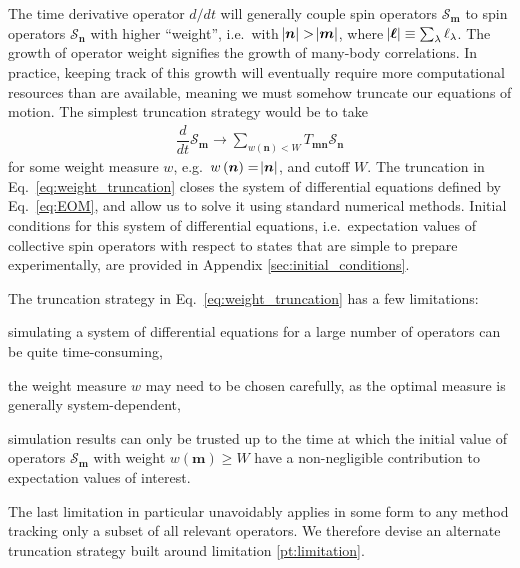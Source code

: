 \documentclass[aps,11pt,notitlepage,nofootinbib,longbibliography]{revtex4-1}
\newcommand{\f}[2]{\dfrac{#1}{#2}} %
\newcommand{\p}[1]{\left(#1\right)} %
\renewcommand{\v}{\bm} %
\renewcommand{\S}{\mathcal{S}}
\newcommand{\1}{\mathds{1}}
\begin{document}
The time derivative operator $d/dt$ will generally couple spin
operators $\S_{\v m}$ to spin operators $\S_{\v n}$ with higher
``weight'', i.e.~with $\abs{\v n}>\abs{\v m}$, where
$\abs{\v\ell}\equiv\sum_\lambda\ell_\lambda$.  The growth of operator
weight signifies the growth of many-body correlations.  In practice,
keeping track of this growth will eventually require more
computational resources than are available, meaning we must somehow
truncate our equations of motion.  The simplest truncation strategy
would be to take
\begin{align}
  \f{d}{dt} \S_{\v m}
  \to \sum_{w\p{\v n}<W} T_{\v m\v n} \S_{\v n}
  \label{eq:weight_truncation}
\end{align}
for some weight measure $w$, e.g.~$w\p{\v n}=\abs{\v n}$, and cutoff
$W$.  The truncation in Eq.~\eqref{eq:weight_truncation} closes the
system of differential equations defined by Eq.~\eqref{eq:EOM}, and
allow us to solve it using standard numerical methods.  Initial
conditions for this system of differential equations, i.e.~expectation
values of collective spin operators with respect to states that are
simple to prepare experimentally, are provided in Appendix
\ref{sec:initial_conditions}.

The truncation strategy in Eq.~\eqref{eq:weight_truncation} has a few
limitations:
\begin{enumerate*}[label=(\roman*)]
\item simulating a system of differential equations for a large number
  of operators can be quite time-consuming,
\item the weight measure $w$ may need to be chosen carefully, as the
  optimal measure is generally system-dependent,
\item simulation results can only be trusted up to the time at which
  the initial value of operators $\S_{\v m}$ with weight
  $w\p{\v m}\ge W$ have a non-negligible contribution to expectation
  values of interest.\label{pt:limitation}
\end{enumerate*}
The last limitation in particular unavoidably applies in some form to
any method tracking only a subset of all relevant operators.  We
therefore devise an alternate truncation strategy built around
limitation \ref{pt:limitation}.
\end{document}
